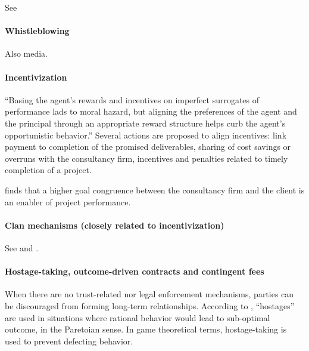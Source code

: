 \documentclass[12pt]{article}
\begin{document}
See \citet[4-5]{sturdy2021}

\hypertarget{whistleblowing}{%
\paragraph{Whistleblowing}\label{whistleblowing}}

Also media.

\hypertarget{incentivization}{%
\paragraph{Incentivization}\label{incentivization}}

``Basing the agent's rewards and incentives on imperfect surrogates of
performance lads to moral hazard, but aligning the preferences of the
agent and the principal through an appropriate reward structure helps
curb the agent's opportunistic behavior.'' \citep[ 13-15]{basu2011}
Several actions are proposed to align incentives: link payment to
completion of the promised deliverables, sharing of cost savings or
overruns with the consultancy firm, incentives and penalties related to
timely completion of a project.

\citet[264-266]{liberatore2010} finds that a higher goal congruence
between the consultancy firm and the client is an enabler of project
performance.

\hypertarget{clan-mechanisms-closely-related-to-incentivization}{%
\paragraph{Clan mechanisms (closely related to
incentivization)}\label{clan-mechanisms-closely-related-to-incentivization}}

See \citet[62]{aubert1996} and \citet{ouchi1980}.

\hypertarget{hostage-taking-outcome-driven-contracts-and-contingent-fees}{%
\paragraph{Hostage-taking, outcome-driven contracts and contingent
fees}\label{hostage-taking-outcome-driven-contracts-and-contingent-fees}}

When there are no trust-related nor legal enforcement mechanisms,
parties can be discouraged from forming long-term relationships.
According to \citet[47-48]{werner1993}, ``hostages'' are used in
situations where rational behavior would lead to sub-optimal outcome, in
the Paretoian sense. In game theoretical terms, hostage-taking is used
to prevent defecting behavior.
\end{document}
